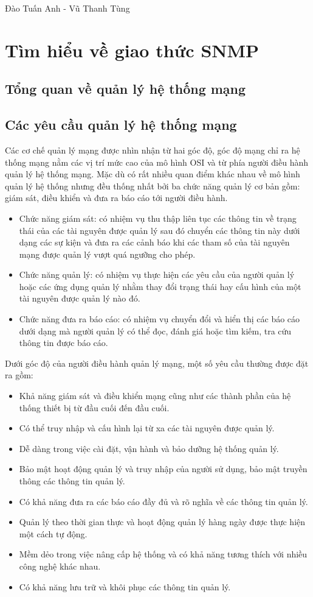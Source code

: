 \documentclass[12pt,oneside,a4paper]{article}
\begin{document}
Đào Tuấn Anh - Vũ Thanh Tùng
\newpage

\section{Tìm hiểu về giao thức SNMP}
\subsection{Tổng quan về quản lý hệ thống mạng}
\subsection{Các yêu cầu quản lý hệ thống mạng}
Các cơ chế quản lý mạng được nhìn nhận từ hai góc độ, góc độ mạng chỉ ra hệ thống mạng nằm các vị trí mức cao của mô hình OSI và từ phía người điều hành quản lý hệ thống mạng. Mặc dù có rất nhiều quan điểm khác nhau về mô hình quản lý hệ thống nhưng đều thống nhất bởi ba chức năng quản lý cơ bản gồm: giám sát, điều khiển và đưa ra báo cáo tới người điều hành.

\begin{itemize}
\item Chức năng giám sát: có nhiệm vụ thu thập liên tục các thông tin về trạng thái của các tài nguyên được quản lý sau đó chuyển các thông tin này dưới dạng các sự kiện và đưa ra các cảnh báo khi các tham số của tài nguyên mạng được quản lý vượt quá ngưỡng cho phép.
\item Chức năng quản lý: có nhiệm vụ thực hiện các yêu cầu của người quản lý hoặc các ứng dụng quản lý nhằm thay đổi trạng thái hay cấu hình của một tài nguyên được quản lý nào đó.
\item Chức năng đưa ra báo cáo: có nhiệm vụ chuyển đổi và hiển thị các báo cáo dưới dạng mà người quản lý có thể đọc, đánh giá hoặc tìm kiếm, tra cứu thông tin được báo cáo.
\end{itemize}

Dưới góc độ của người điều hành quản lý mạng, một số yêu cầu thường được đặt ra gồm:
\begin{itemize}
\item Khả năng giám sát và điều khiển mạng cũng như các thành phần của hệ thống thiết bị từ đầu cuối đến đầu cuối.
\item Có thể truy nhập và cấu hình lại từ xa các tài nguyên được quản lý.
\item Dễ dàng trong việc cài đặt, vận hành và bảo dưỡng hệ thống quản lý.
\item Bảo mật hoạt động quản lý và truy nhập của người sử dụng, bảo mật truyền thông các thông tin quản lý.
\item Có khả năng đưa ra các báo cáo đầy đủ và rõ nghĩa về các thông tin quản lý.
\item Quản lý theo thời gian thực và hoạt động quản lý hàng ngày được thực hiện một cách tự động.
\item Mềm dẻo trong việc nâng cấp hệ thống và có khả năng tương thích với nhiều công nghệ khác nhau.
\item Có khả năng lưu trữ và khôi phục các thông tin quản lý.
\end{itemize}
\end{document}
